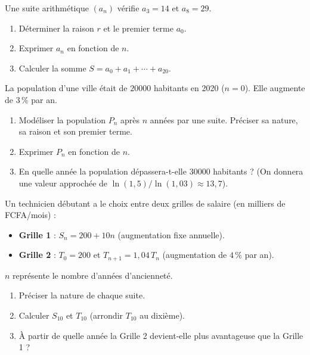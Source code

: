 \documentclass[11pt]{article}
\begin{document}
\begin{exercice}
Une suite arithmétique $(a_n)$ vérifie $a_3 = 14$ et $a_8 = 29$.
\begin{enumerate}
\item Déterminer la raison $r$ et le premier terme $a_0$.
\item Exprimer $a_n$ en fonction de $n$.
\item Calculer la somme $S = a_0 + a_1 + \cdots + a_{20}$.
\end{enumerate}
\end{exercice}

\begin{exercice}
La population d'une ville était de $\num{20000}$ habitants en 2020 ($n=0$). Elle augmente de $3\,\%$ par an.
\begin{enumerate}
\item Modéliser la population $P_n$ après $n$ années par une suite. Préciser sa nature, sa raison et son premier terme.
\item Exprimer $P_n$ en fonction de $n$.
\item En quelle année la population dépassera-t-elle $\num{30000}$ habitants ? (On donnera une valeur approchée de $\ln(1,5)/\ln(1,03) \approx 13,7$).
\end{enumerate}
\end{exercice}

\begin{exercice}
Un technicien débutant a le choix entre deux grilles de salaire (en milliers de FCFA/mois) :
\begin{itemize}
\item \textbf{Grille 1} : $S_n = 200 + 10n$ (augmentation fixe annuelle).
\item \textbf{Grille 2} : $T_0 = 200$ et $T_{n+1} = 1,04\, T_n$ (augmentation de $4\,\%$ par an).
\end{itemize}
$n$ représente le nombre d'années d'ancienneté.
\begin{enumerate}
\item Préciser la nature de chaque suite.
\item Calculer $S_{10}$ et $T_{10}$ (arrondir $T_{10}$ au dixième).
\item À partir de quelle année la Grille 2 devient-elle plus avantageuse que la Grille 1 ?
\end{enumerate}
\end{exercice}
\end{document}
